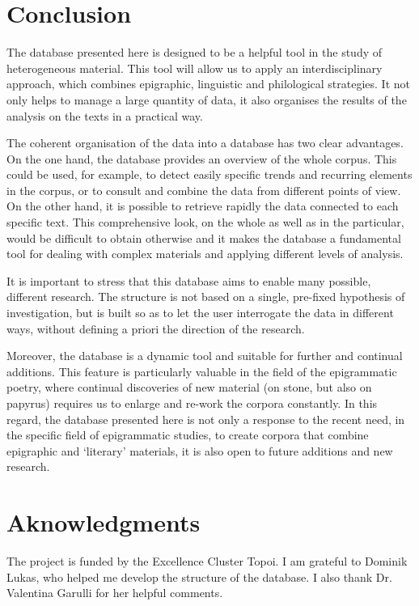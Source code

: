 \documentclass[amsthm,ebook]{saparticle}
\begin{document}
\section{Conclusion}


\noindent The database presented here is designed to be a helpful tool in the study of heterogeneous material. This tool will
allow us to apply an interdisciplinary approach, which combines epigraphic, linguistic and philological strategies. It
not only helps to manage a large quantity of data, it also organises the results of the analysis on the texts in a
practical way. 

The coherent organisation of the data into a database has two clear advantages. On the one hand, the database provides
an overview of the whole corpus. This could be used, for example, to detect easily specific trends and recurring
elements in the corpus, or to consult and combine the data from different points of view. On the other hand, it is
possible to retrieve rapidly the data connected to each specific text. This comprehensive look, on the whole as well as
in the particular, would be difficult to obtain otherwise and it makes the database a fundamental tool for dealing with
complex materials and applying different levels of analysis.

It is important to stress that this database aims to enable many possible, different research. The structure is not
based on a single, pre-fixed hypothesis of investigation, but is built so as to let the user interrogate the data in
different ways, without defining a priori the direction of the research. 

Moreover, the database is a dynamic tool and suitable for further and continual additions. This feature is
particularly valuable in the field of the epigrammatic poetry, where continual discoveries of new material (on stone,
but also on papyrus) requires us to enlarge and re-work the corpora constantly. In this regard, the database presented
here is not only a response to the recent need, in the specific field of epigrammatic studies, to create corpora that
combine epigraphic and `literary' materials, it is also open to future additions and new research.




\section*{Aknowledgments}

\noindent The project is funded by the Excellence Cluster Topoi. I am grateful to Dominik Lukas, who helped me develop the
structure of the database. I also thank Dr. Valentina Garulli for her helpful comments.



\end{document}
